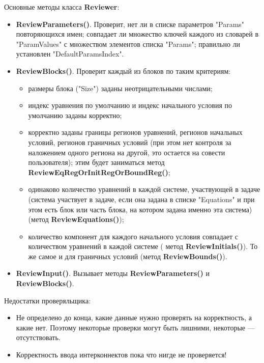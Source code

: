 \documentclass[a4paper]{article}
\begin{document}
Основные методы класса {\bf Reviewer}:
\begin{itemize}
\item {\bf ReviewParameters()}. Проверит, нет ли в списке параметров "Pa\-rams" повторяющихся имен; совпадает ли множество ключей каждого из словарей в "ParamValues" с множеством элементов списка "Params"; правильно ли установлен "DefaultParamsIndex".
\item {\bf ReviewBlocks()}. Проверит каждый из блоков по таким критериям: 
	\begin{itemize}
	\item размеры блока ("Size") заданы неотрицательными числами;
	\item индекс уравнения по умолчанию и индекс начального условия по умолчанию заданы корректно;
	\item корректно заданы границы регионов уравнений, регионов на\-чаль\-ных условий, регионов граничных условий (при этом нет контроля за наложением одного региона на 	другой, это остается на совести пользователя); этим будет заниматься метод {\bf ReviewEqRegOrInitRegOrBoundReg()};
	\item одинаково количество уравнений в каждой системе, участвующей в задаче (система участвует в задаче, если она задана в списке "Equations" и при этом есть блок или часть блока, на котором задана именно эта система) (метод {\bf ReviewEquations()});
	\item количество компонент для каждого начального условия совпадает с количеством уравнений в каждой системе ( метод {\bf ReviewInitials()}). То же самое и для граничных условий (метод {\bf ReviewBounds()}).
	\end{itemize}
\item {\bf ReviewInput()}. Вызывает методы {\bf ReviewParameters()} и {\bf ReviewBlocks()}.
\end{itemize}
Недостатки проверяльщика:
\begin{itemize}
\item Не определено до конца, какие данные нужно проверять на корректность, а какие нет. Поэтому некоторые проверки могут быть лишними, некоторые --- отсутствовать.
\item Корректность ввода интерконнектов пока что нигде не проверяется!
\end{itemize}

\end{document}
